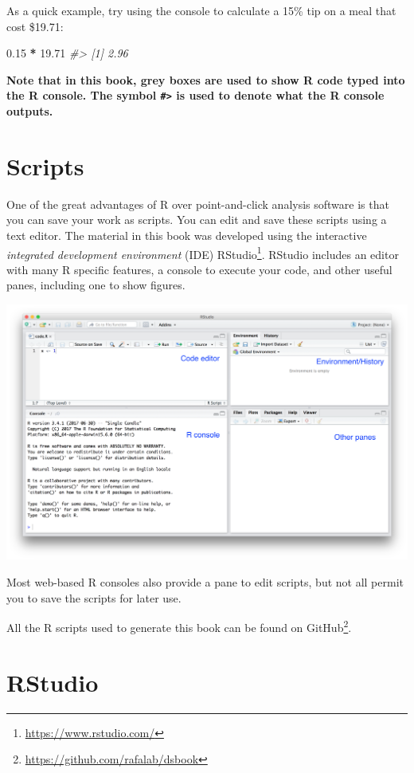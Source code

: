 \documentclass[
]{krantz}
\newenvironment{Shaded}{\begin{snugshade}}{\end{snugshade}}
\newcommand{\CommentTok}[1]{\textcolor[rgb]{0.37,0.37,0.37}{\textit{#1}}}
\newcommand{\FloatTok}[1]{\textcolor[rgb]{0.06,0.06,0.06}{#1}}
\newcommand{\OperatorTok}[1]{\textcolor[rgb]{0.43,0.43,0.43}{\textbf{#1}}}
\newcommand{\StringTok}[1]{\textcolor[rgb]{0.5,0.5,0.5}{#1}}
\begin{document}
As a quick example, try using the console to calculate a 15\% tip on a meal that cost \$19.71:

\begin{Shaded}
\begin{Highlighting}[]
\FloatTok{0.15} \OperatorTok{*}\StringTok{ }\FloatTok{19.71}  
\CommentTok{#> [1] 2.96}
\end{Highlighting}
\end{Shaded}

\textbf{Note that in this book, grey boxes are used to show R code typed into the R console. The symbol \texttt{\#\textgreater{}} is used to denote what the R console outputs.}

\hypertarget{scripts}{%
\section{Scripts}\label{scripts}}

One of the great advantages of R over point-and-click analysis software is that you can save your work as scripts. You can edit and save these scripts using a text editor. The material in this book was developed using the interactive \emph{integrated development environment} (IDE) RStudio\footnote{\url{https://www.rstudio.com/}}. RStudio includes an editor with many R specific features, a console to execute your code, and other useful panes, including one to show figures.

\begin{center}\includegraphics[width=0.7\linewidth]{R/img/rstudio} \end{center}

Most web-based R consoles also provide a pane to edit scripts, but not all permit you to save the scripts for later use.

All the R scripts used to generate this book can be found on GitHub\footnote{\url{https://github.com/rafalab/dsbook}}.

\hypertarget{rstudio}{%
\section{RStudio}\label{rstudio}}
\end{document}
